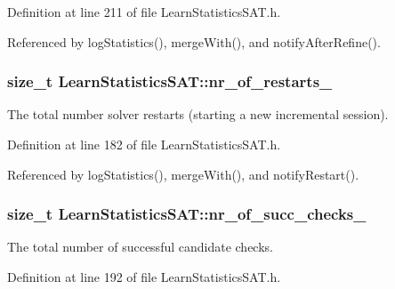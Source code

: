Definition at line 211 of file Learn\-Statistics\-S\-A\-T.\-h.



Referenced by log\-Statistics(), merge\-With(), and notify\-After\-Refine().

\hypertarget{classLearnStatisticsSAT_a07c8eee4a3c82762e3a94e38440f3adb}{
\subsubsection[{nr\-\_\-of\-\_\-restarts\-\_\-}]{\setlength{\rightskip}{0pt plus 5cm}size\-\_\-t Learn\-Statistics\-S\-A\-T\-::nr\-\_\-of\-\_\-restarts\-\_\-\hspace{0.3cm}{\ttfamily [protected]}}}\label{classLearnStatisticsSAT_a07c8eee4a3c82762e3a94e38440f3adb}


The total number solver restarts (starting a new incremental session). 



Definition at line 182 of file Learn\-Statistics\-S\-A\-T.\-h.



Referenced by log\-Statistics(), merge\-With(), and notify\-Restart().

\hypertarget{classLearnStatisticsSAT_aa059a13f6afcf98a04be072aa5ce3f1d}{
\subsubsection[{nr\-\_\-of\-\_\-succ\-\_\-checks\-\_\-}]{\setlength{\rightskip}{0pt plus 5cm}size\-\_\-t Learn\-Statistics\-S\-A\-T\-::nr\-\_\-of\-\_\-succ\-\_\-checks\-\_\-\hspace{0.3cm}{\ttfamily [protected]}}}\label{classLearnStatisticsSAT_aa059a13f6afcf98a04be072aa5ce3f1d}


The total number of successful candidate checks. 



Definition at line 192 of file Learn\-Statistics\-S\-A\-T.\-h.



